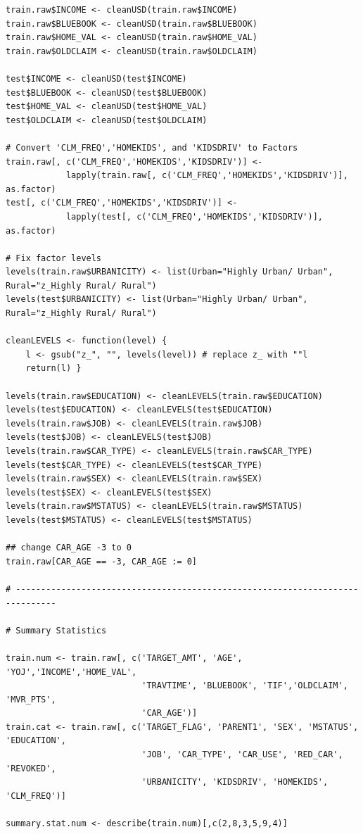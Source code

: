 \documentclass[]{article}
\begin{document}
\begin{verbatim}
train.raw$INCOME <- cleanUSD(train.raw$INCOME)
train.raw$BLUEBOOK <- cleanUSD(train.raw$BLUEBOOK)
train.raw$HOME_VAL <- cleanUSD(train.raw$HOME_VAL)
train.raw$OLDCLAIM <- cleanUSD(train.raw$OLDCLAIM)

test$INCOME <- cleanUSD(test$INCOME)
test$BLUEBOOK <- cleanUSD(test$BLUEBOOK)
test$HOME_VAL <- cleanUSD(test$HOME_VAL)
test$OLDCLAIM <- cleanUSD(test$OLDCLAIM)

# Convert 'CLM_FREQ','HOMEKIDS', and 'KIDSDRIV' to Factors
train.raw[, c('CLM_FREQ','HOMEKIDS','KIDSDRIV')] <- 
            lapply(train.raw[, c('CLM_FREQ','HOMEKIDS','KIDSDRIV')], as.factor)
test[, c('CLM_FREQ','HOMEKIDS','KIDSDRIV')] <- 
            lapply(test[, c('CLM_FREQ','HOMEKIDS','KIDSDRIV')], as.factor)

# Fix factor levels
levels(train.raw$URBANICITY) <- list(Urban="Highly Urban/ Urban", Rural="z_Highly Rural/ Rural")
levels(test$URBANICITY) <- list(Urban="Highly Urban/ Urban", Rural="z_Highly Rural/ Rural")

cleanLEVELS <- function(level) {
    l <- gsub("z_", "", levels(level)) # replace z_ with ""l
    return(l) }

levels(train.raw$EDUCATION) <- cleanLEVELS(train.raw$EDUCATION)
levels(test$EDUCATION) <- cleanLEVELS(test$EDUCATION)
levels(train.raw$JOB) <- cleanLEVELS(train.raw$JOB)
levels(test$JOB) <- cleanLEVELS(test$JOB)
levels(train.raw$CAR_TYPE) <- cleanLEVELS(train.raw$CAR_TYPE)
levels(test$CAR_TYPE) <- cleanLEVELS(test$CAR_TYPE)
levels(train.raw$SEX) <- cleanLEVELS(train.raw$SEX)
levels(test$SEX) <- cleanLEVELS(test$SEX)
levels(train.raw$MSTATUS) <- cleanLEVELS(train.raw$MSTATUS)
levels(test$MSTATUS) <- cleanLEVELS(test$MSTATUS)

## change CAR_AGE -3 to 0
train.raw[CAR_AGE == -3, CAR_AGE := 0]

# ------------------------------------------------------------------------------

# Summary Statistics

train.num <- train.raw[, c('TARGET_AMT', 'AGE', 'YOJ','INCOME','HOME_VAL',
                           'TRAVTIME', 'BLUEBOOK', 'TIF','OLDCLAIM', 'MVR_PTS',
                           'CAR_AGE')]
train.cat <- train.raw[, c('TARGET_FLAG', 'PARENT1', 'SEX', 'MSTATUS', 'EDUCATION',
                           'JOB', 'CAR_TYPE', 'CAR_USE', 'RED_CAR', 'REVOKED',
                           'URBANICITY', 'KIDSDRIV', 'HOMEKIDS', 'CLM_FREQ')]

summary.stat.num <- describe(train.num)[,c(2,8,3,5,9,4)]


\end{verbatim}
\end{document}
